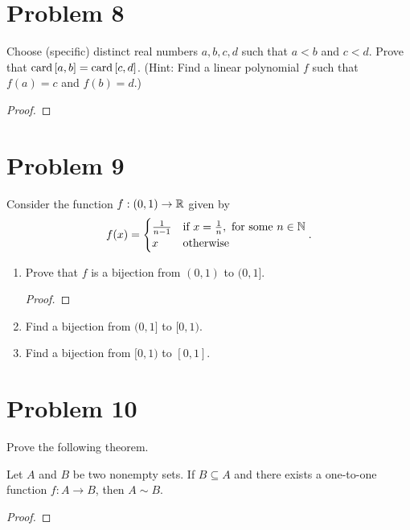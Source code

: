 \documentclass[11pt,a4paper]{article}
\begin{document}
\section*{Problem 8} Choose (specific) distinct real numbers \( a,b,c,d  \) such that \( a < b  \) and \( c < d  \). Prove that \( \operatorname{card}{[a,b]} = \operatorname{card}{[c,d]}  \). (Hint: Find a linear polynomial \( f  \) such that \( f(a) = c  \) and \( f(b) = d  \).)
\begin{proof}

\end{proof}

\section*{Problem 9} Consider the function \( f: (0,1) \to \mathbb{R}  \) given by 
\[  f(x) = 
\begin{cases}
    \frac{ 1 }{ n - 1  }  &\text{if} \ x = \frac{ 1 }{ n }, \  \text{for some} \ n \in \mathbb{N} \\ 
    x &\text{otherwise}
\end{cases}. 
\]
\begin{enumerate}
    \item Prove that \( f  \) is a bijection from \( (0,1)  \) to \( (0,1] \).
        \begin{proof}
        
        \end{proof}
    \item Find a bijection from \( (0,1]  \) to \( [0,1) \).
        \begin{solution}
            
        \end{solution}
    \item Find a bijection from \(  [0,1)  \) to \( [0,1] \).
        \begin{solution}
        
        \end{solution}

\end{enumerate}


\section{Problem 10} Prove the following theorem.

\begin{theorem}[ ]
    Let \( A  \) and \( B  \) be two nonempty sets. If \( B \subseteq A  \) and there exists a one-to-one function \( f: A \to B  \), then \( A \sim B  \).
\end{theorem}
\begin{proof}

\end{proof}
\end{document}
